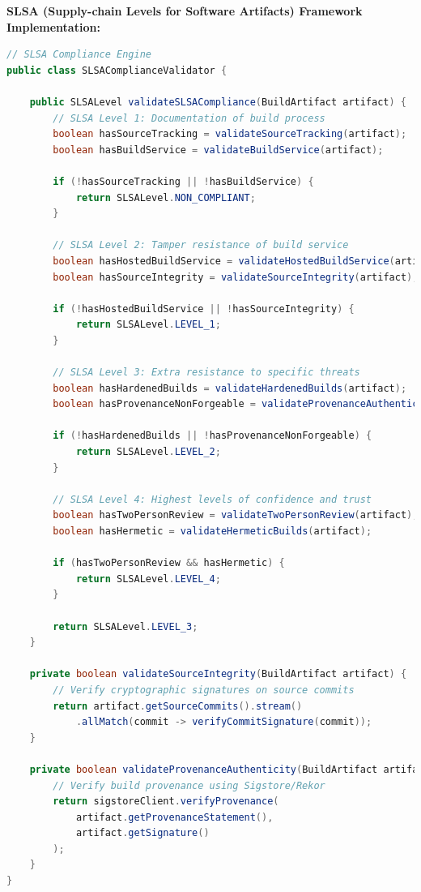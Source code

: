 \textbf{SLSA (Supply-chain Levels for Software Artifacts) Framework Implementation:}
\begin{lstlisting}[breaklines=true,basicstyle=\ttfamily\footnotesize,language=Java]
// SLSA Compliance Engine
public class SLSAComplianceValidator {
    
    public SLSALevel validateSLSACompliance(BuildArtifact artifact) {
        // SLSA Level 1: Documentation of build process
        boolean hasSourceTracking = validateSourceTracking(artifact);
        boolean hasBuildService = validateBuildService(artifact);
        
        if (!hasSourceTracking || !hasBuildService) {
            return SLSALevel.NON_COMPLIANT;
        }
        
        // SLSA Level 2: Tamper resistance of build service
        boolean hasHostedBuildService = validateHostedBuildService(artifact);
        boolean hasSourceIntegrity = validateSourceIntegrity(artifact);
        
        if (!hasHostedBuildService || !hasSourceIntegrity) {
            return SLSALevel.LEVEL_1;
        }
        
        // SLSA Level 3: Extra resistance to specific threats
        boolean hasHardenedBuilds = validateHardenedBuilds(artifact);
        boolean hasProvenanceNonForgeable = validateProvenanceAuthenticity(artifact);
        
        if (!hasHardenedBuilds || !hasProvenanceNonForgeable) {
            return SLSALevel.LEVEL_2;
        }
        
        // SLSA Level 4: Highest levels of confidence and trust
        boolean hasTwoPersonReview = validateTwoPersonReview(artifact);
        boolean hasHermetic = validateHermeticBuilds(artifact);
        
        if (hasTwoPersonReview && hasHermetic) {
            return SLSALevel.LEVEL_4;
        }
        
        return SLSALevel.LEVEL_3;
    }
    
    private boolean validateSourceIntegrity(BuildArtifact artifact) {
        // Verify cryptographic signatures on source commits
        return artifact.getSourceCommits().stream()
            .allMatch(commit -> verifyCommitSignature(commit));
    }
    
    private boolean validateProvenanceAuthenticity(BuildArtifact artifact) {
        // Verify build provenance using Sigstore/Rekor
        return sigstoreClient.verifyProvenance(
            artifact.getProvenanceStatement(),
            artifact.getSignature()
        );
    }
}
\end{lstlisting}

